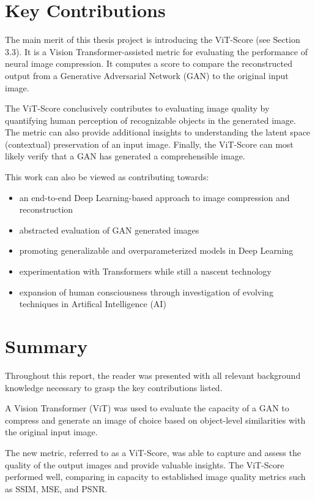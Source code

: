 \section{Key Contributions}

The main merit of this thesis project is introducing the ViT-Score (see Section 3.3).
It is a Vision Transformer-assisted metric for evaluating the performance of neural image compression. 
It computes a score to compare the reconstructed output from a Generative Adversarial Network (GAN) to the original 
input image.


The ViT-Score conclusively contributes to evaluating image quality by quantifying human perception of recognizable objects in the generated image. 
The metric can also provide additional insights to understanding the latent space (contextual) preservation of an input image.
Finally, the ViT-Score can most likely verify that a GAN has generated a comprehensible image.

This work can also be viewed as contributing towards:

\begin{itemize}
    \item an end-to-end Deep Learning-based approach to image compression and reconstruction 
    \item abstracted evaluation of GAN generated images 
	\item promoting generalizable and overparameterized models in Deep Learning
	\item experimentation with Transformers while still a nascent technology
	\item expansion of human consciousness through investigation of evolving techniques in Artifical Intelligence (AI) 
\end{itemize} 


\section{Summary}

Throughout this report, the reader was presented with all relevant background knowledge necessary 
to grasp the key contributions listed. 


A Vision Transformer (ViT) was used to evaluate the capacity of 
a GAN to compress and generate an image of choice based on object-level similarities with the original input image.


The new metric, referred to as a ViT-Score, was able to capture and assess the quality of the output images and provide 
valuable insights. The ViT-Score performed well, comparing in capacity to established image quality metrics such as
SSIM, MSE, and PSNR. 


